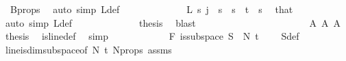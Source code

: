 \begin{isabellebody}
\ {}\ B{\isacharunderscore}{\kern0pt}props\ \isamarkupfalse%
\ {\isacharparenleft}{\kern0pt}auto\ simp{\isacharcolon}{\kern0pt}\ L{\isacharprime}{\kern0pt}{\isacharunderscore}{\kern0pt}def{\isacharparenright}{\kern0pt}\isanewline
\ \ \ \ \ \ \ \ \ \ \isamarkupfalse%
\ \isamarkupfalse%
\ {\isachardoublequoteopen}L{\isacharprime}{\kern0pt}\ s\ j\ {\isacharequal}{\kern0pt}\ s{\isachardoublequoteclose}\ \ {\isachardoublequoteopen}s\ {\isacharless}{\kern0pt}\ t{\isacharplus}{\kern0pt}{}{\isachardoublequoteclose}\ \ s\ \isamarkupfalse%
\ that\ \isamarkupfalse%
\ {\isacharparenleft}{\kern0pt}auto\ simp{\isacharcolon}{\kern0pt}\ L{\isacharprime}{\kern0pt}{\isacharunderscore}{\kern0pt}def{\isacharparenright}{\kern0pt}\isanewline
\ \ \ \ \ \ \ \ \ \ \isamarkupfalse%
\ \isamarkupfalse%
\ {\isacharquery}{\kern0pt}thesis\ \isamarkupfalse%
\ blast\isanewline
\ \ \ \ \ \ \ \ \isamarkupfalse%
\isanewline
\ \ \ \ \ \ \isamarkupfalse%
\isanewline
\ \ \ \ \ \ \isamarkupfalse%
\ A{}\ A{}\ A{}\ \isamarkupfalse%
\ {\isacharquery}{\kern0pt}thesis\ \isamarkupfalse%
\ is{\isacharunderscore}{\kern0pt}line{\isacharunderscore}{\kern0pt}def\ \isamarkupfalse%
\ simp\isanewline
\ \ \ \ \isamarkupfalse%
\isanewline
\ \ \ \ \isamarkupfalse%
\ \isamarkupfalse%
\ F{}{\isacharcolon}{\kern0pt}\ {\isachardoublequoteopen}is{\isacharunderscore}{\kern0pt}subspace\ S{}\ {}\ N{\isacharprime}{\kern0pt}\ {\isacharparenleft}{\kern0pt}t\ {\isacharplus}{\kern0pt}\ {}{\isacharparenright}{\kern0pt}{\isachardoublequoteclose}\ \isamarkupfalse%
\ S{}{\isacharunderscore}{\kern0pt}def\ \isanewline
\ \ \ \ \ \ \isamarkupfalse%
\ line{\isacharunderscore}{\kern0pt}is{\isacharunderscore}{\kern0pt}dim{}{\isacharunderscore}{\kern0pt}subspace{\isacharbrackleft}{\kern0pt}of\ {\isachardoublequoteopen}N{\isacharprime}{\kern0pt}{\isachardoublequoteclose}\ {\isachardoublequoteopen}t{\isacharplus}{\kern0pt}{}{\isachardoublequoteclose}{\isacharbrackright}{\kern0pt}\ N{\isacharprime}{\kern0pt}{\isacharunderscore}{\kern0pt}props\ assms{\isacharparenleft}{\kern0pt}{}{\isacharparenright}{\kern0pt}\ \isamarkupfalse%

\end{isabellebody}
